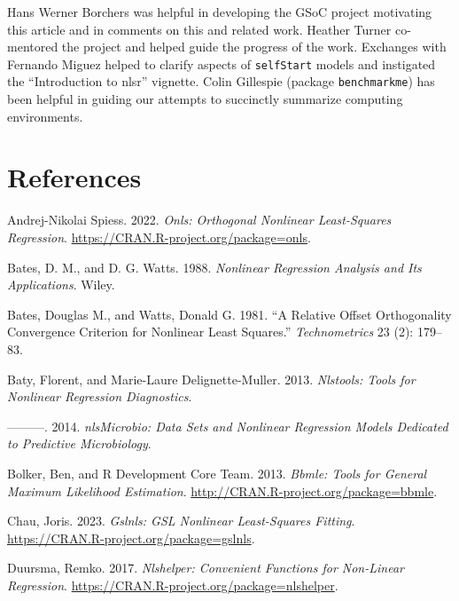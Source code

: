\documentclass[
]{article}
\newlength{\cslhangindent}
\newlength{\cslentryspacingunit} %
\newenvironment{CSLReferences}[2] %
 {%
  \setlength{\parindent}{0pt}
  \ifodd #1
  \let\oldpar\par
  \def\par{\hangindent=\cslhangindent\oldpar}
  \fi
  \setlength{\parskip}{#2\cslentryspacingunit}
 }%
 {}
\begin{document}
Hans Werner Borchers was helpful in developing the GSoC project
motivating this article and in comments on this and related work.
Heather Turner co-mentored the project and helped guide the progress of
the work. Exchanges with Fernando Miguez helped to clarify aspects of
\texttt{selfStart} models and instigated the ``Introduction to nlsr''
vignette. Colin Gillespie (package \texttt{benchmarkme}) has been
helpful in guiding our attempts to succinctly summarize computing
environments.

\hypertarget{references}{%
\section{References}\label{references}}

\hypertarget{refs}{}
\begin{CSLReferences}{1}{0}
\leavevmode{}%
Andrej-Nikolai Spiess. 2022. \emph{Onls: Orthogonal Nonlinear
Least-Squares Regression}.
\url{https://CRAN.R-project.org/package=onls}.

\leavevmode{}%
Bates, D. M., and D. G. Watts. 1988. \emph{Nonlinear Regression Analysis
and Its Applications}. Wiley.

\leavevmode{}%
Bates, Douglas M., and Watts, Donald G. 1981. {``A Relative Offset
Orthogonality Convergence Criterion for Nonlinear Least Squares.''}
\emph{Technometrics} 23 (2): 179--83.

\leavevmode{}%
Baty, Florent, and Marie-Laure Delignette-Muller. 2013. \emph{Nlstools:
Tools for Nonlinear Regression Diagnostics}.

\leavevmode{}%
---------. 2014. \emph{nlsMicrobio: Data Sets and Nonlinear Regression
Models Dedicated to Predictive Microbiology}.

\leavevmode{}%
Bolker, Ben, and R Development Core Team. 2013. \emph{Bbmle: Tools for
General Maximum Likelihood Estimation}.
\url{http://CRAN.R-project.org/package=bbmle}.

\leavevmode{}%
Chau, Joris. 2023. \emph{Gslnls: GSL Nonlinear Least-Squares Fitting}.
\url{https://CRAN.R-project.org/package=gslnls}.

\leavevmode{}%
Duursma, Remko. 2017. \emph{Nlshelper: Convenient Functions for
Non-Linear Regression}.
\url{https://CRAN.R-project.org/package=nlshelper}.


\end{CSLReferences}
\end{document}
